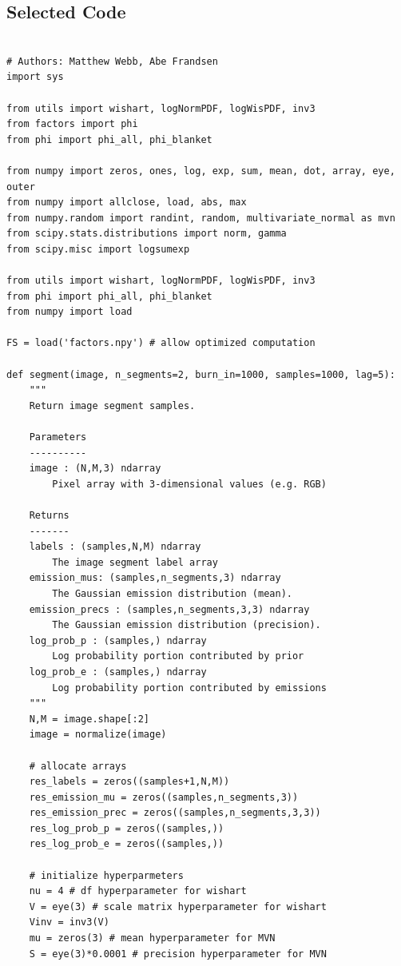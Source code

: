 \documentclass[12pt]{article}
\begin{document}
\subsection{Selected Code}

\begin{verbatim}

# Authors: Matthew Webb, Abe Frandsen
import sys

from utils import wishart, logNormPDF, logWisPDF, inv3
from factors import phi
from phi import phi_all, phi_blanket

from numpy import zeros, ones, log, exp, sum, mean, dot, array, eye, outer
from numpy import allclose, load, abs, max
from numpy.random import randint, random, multivariate_normal as mvn
from scipy.stats.distributions import norm, gamma
from scipy.misc import logsumexp

from utils import wishart, logNormPDF, logWisPDF, inv3
from phi import phi_all, phi_blanket
from numpy import load

FS = load('factors.npy') # allow optimized computation

def segment(image, n_segments=2, burn_in=1000, samples=1000, lag=5):
    """
    Return image segment samples.

    Parameters
    ----------
    image : (N,M,3) ndarray
        Pixel array with 3-dimensional values (e.g. RGB)

    Returns
    -------
    labels : (samples,N,M) ndarray
        The image segment label array
    emission_mus: (samples,n_segments,3) ndarray
        The Gaussian emission distribution (mean).
    emission_precs : (samples,n_segments,3,3) ndarray
        The Gaussian emission distribution (precision).
    log_prob_p : (samples,) ndarray
        Log probability portion contributed by prior
    log_prob_e : (samples,) ndarray
        Log probability portion contributed by emissions
    """
    N,M = image.shape[:2]
    image = normalize(image)

    # allocate arrays
    res_labels = zeros((samples+1,N,M))
    res_emission_mu = zeros((samples,n_segments,3))
    res_emission_prec = zeros((samples,n_segments,3,3))
    res_log_prob_p = zeros((samples,))
    res_log_prob_e = zeros((samples,))

    # initialize hyperparmeters
    nu = 4 # df hyperparameter for wishart
    V = eye(3) # scale matrix hyperparameter for wishart
    Vinv = inv3(V)
    mu = zeros(3) # mean hyperparameter for MVN
    S = eye(3)*0.0001 # precision hyperparameter for MVN



\end{verbatim}
\end{document}
